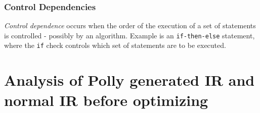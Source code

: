 \documentclass{article}
\begin{document}
\begin{flushleft}
\subsubsection*{Control Dependencies}
\textit{Control dependence} occurs when the order of the execution of a set of statements is controlled - possibly by an algorithm. Example is an \texttt{if-then-else} statement, where the \texttt{if} check controls which set of statements are to be executed. 
\end{flushleft}

\section{Analysis of Polly generated IR and normal IR before optimizing}
\end{document}
